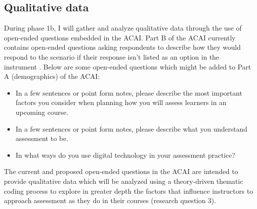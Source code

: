 \documentclass[
]{book}
\providecommand{\tightlist}{%
  \setlength{\itemsep}{0pt}\setlength{\parskip}{0pt}}
\begin{document}
\hypertarget{qualitative-data}{%
\subsection*{Qualitative data}\label{qualitative-data}}

During phase 1b, I will gather and analyze qualitative data through the use of open-ended questions embedded in the ACAI. Part B of the ACAI currently contains open-ended questions asking respondents to describe how they would respond to the scenario if their response isn't listed as an option in the instrument \citep{delucaACAIInstrumentSpecificationsND}. Below are some open-ended questions which might be added to Part A (demographics) of the ACAI:

\begin{itemize}
\tightlist
\item
  In a few sentences or point form notes, please describe the most important factors you consider when planning how you will assess learners in an upcoming course.
\item
  In a few sentences or point form notes, please describe what you understand assessment to be.
\item
  In what ways do you use digital technology in your assessment practice?
\end{itemize}

The current and proposed open-ended questions in the ACAI are intended to provide qualitative data which will be analyzed using a theory-driven thematic coding process \citep{delucaStudentPerspectivesAssessment2018, nameyDataReductionTechniques2008} to explore in greater depth the factors that influence instructors to approach assessment as they do in their courses (research question 3).
\end{document}
